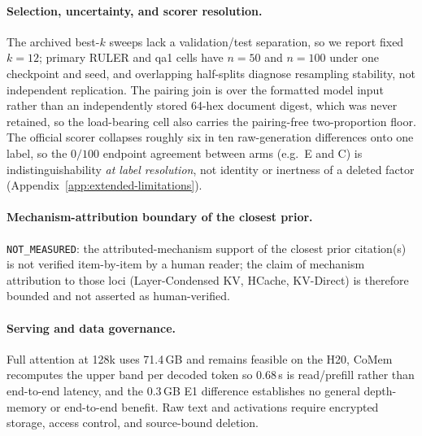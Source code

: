 \paragraph{Selection, uncertainty, and scorer resolution.}
The archived best-$k$ sweeps lack a validation/test separation, so we report
fixed $k=12$; primary RULER and qa1 cells have $n=50$ and $n=100$ under one
checkpoint and seed, and overlapping half-splits diagnose resampling stability,
not independent replication.  The pairing join is over the formatted model input
rather than an independently stored 64-hex document digest, which was never
retained, so the load-bearing cell also carries the pairing-free two-proportion
floor.  The official scorer collapses roughly six in ten raw-generation
differences onto one label, so the $0/100$ endpoint agreement between arms (e.g.\
E and C) is indistinguishability \emph{at label resolution}, not identity or
inertness of a deleted factor (Appendix~\ref{app:extended-limitations}).

\paragraph{Mechanism-attribution boundary of the closest prior.}
\texttt{NOT\_MEASURED}: the attributed-mechanism support of the closest prior citation(s)
is not verified item-by-item by a human reader; the claim of mechanism
attribution to those loci (Layer-Condensed KV, HCache, KV-Direct) is therefore
bounded and not asserted as human-verified.

\paragraph{Serving and data governance.}
Full attention at 128k uses 71.4\,GB and remains feasible on the H20, CoMem
recomputes the upper band per decoded token so 0.68\,s is read/prefill rather
than end-to-end latency, and the 0.3\,GB E1 difference establishes no general
depth-memory or end-to-end benefit.  Raw text and activations require encrypted
storage, access control, and source-bound deletion.

